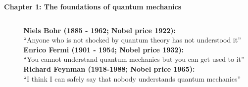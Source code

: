 \renewcommand{\theequation}{1.\arabic{equation}}

\begin{frame}
\begin{center}
{\bf Chapter 1: The foundations of quantum mechanics}\\
\end{center}

\scriptsize

\begin{columns}
\begin{column}{2cm}


\end{column}
\begin{column}{8cm}
\textbf{Niels Bohr (1885 - 1962; Nobel price 1922):}\\
``Anyone who is not shocked by quantum theory has not understood it''\\
\vspace*{1.5cm}
\textbf{Enrico Fermi (1901 - 1954; Nobel price 1932):}\\
``You cannot understand quantum mechanics but you can get used to it''\\
\vspace*{1.5cm}
\textbf{Richard Feynman (1918-1988; Nobel price 1965):}\\
``I think I can safely say that nobody understands quantum mechanics''\\

\end{column}
\end{columns}
\end{frame}

\scriptsize

